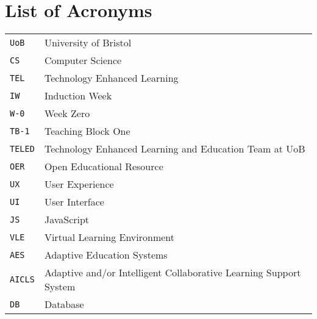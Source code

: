 \chapter*{List of Acronyms}
\begin{SingleSpace}
\setlength{\parindent}{0pt}


\begin{tabular}{lp{6cm}}


  \verb|UoB|                 & University of Bristol \\
  \verb|CS|                  & Computer Science\\
  \verb|TEL|                 & Technology Enhanced Learning\\
  \verb|IW|                  & Induction Week\\
  \verb|W-0|                 & Week Zero\\
  \verb|TB-1|                & Teaching Block One\\
  \verb|TELED|                  & Technology Enhanced Learning and Education Team at UoB\\
  \verb|OER|                  & Open Educational Resource\\
  \verb|UX|                  & User Experience\\
  \verb|UI|                  & User Interface\\
  \verb|JS|                  & JavaScript\\
  \verb|VLE|                  & Virtual Learning Environment\\
  \verb|AES|                  & Adaptive Education Systems\\
  \verb|AICLS|                  & Adaptive and/or Intelligent Collaborative Learning Support System\\
  \verb|DB|                  & Database\\

  
\end{tabular}






\end{SingleSpace}
\clearpage